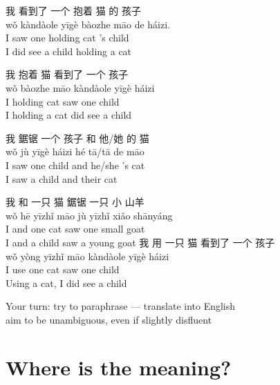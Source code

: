 \documentclass[a4paper,landscape,headrule,footrule,xetex,25pt]{foils}
\begin{document}
\begin{exe}
  \ex \glll 我 看到了 一个 抱着 猫 的 孩子 \\
  wǒ   kàndàole    yīgè   bàozhe  māo  de    háizi. \\
  I saw one holding cat 's child \\
  \trans I did see a child holding a cat

  \ex \glll 我 抱着 猫 看到了 一个 孩子 \\
  wǒ  bàozhe māo kàndàole  yīgè     háizi \\
  I holding cat saw one  child \\
 \trans I holding a cat did see a child

  \ex \glll 我 鋸锯  一个 孩子 和 他/她 的 猫 \\
wǒ jù  yīgè    háizi  hé  tā/tā   de māo \\
 I      saw    one    child   and     he/she  's cat\\
 \trans I saw  a child and their cat 

  \ex \glll 我 和 一只 猫 鋸锯 一只 小 山羊 \\
wǒ hē  yīzhǐ  māo jù yīzhǐ xiǎo  shānyáng  \\
I and one cat saw one small goat \\

\trans I and a child saw a young goat
  \ex \glll 我 用 一只 猫 看到了 一个 孩子 \\
wǒ yòng yīzhǐ  māo kàndàole  yīgè  háizi \\
I use one cat saw one child \\
\trans Using a cat, I did see a child
\end{exe}

\bigskip
\begin{center} \large
  Your turn: try to paraphrase --- translate into English
  \\ aim to be unambiguous, even if slightly disfluent\task
\end{center}
\section{Where is the meaning?}

\end{document}
